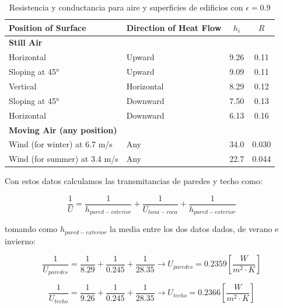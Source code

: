 \begin{table}[ht]
	\centering
	\caption{Resistencia y conductancia para aire y superficies de edificios con $\epsilon = 0.9$}
	\label{tab:building_surface_transmittances}
	\begin{tabular}{llcc}
		\toprule
		\textbf{Position of Surface}       & \textbf{Direction of Heat Flow} & $h_i$ & $R$   \\
		\midrule
		\textbf{Still Air}                 &                                 &       &       \\
		Horizontal                         & Upward                          & 9.26  & 0.11  \\
		Sloping at 45°                     & Upward                          & 9.09  & 0.11  \\
		Vertical                           & Horizontal                      & 8.29  & 0.12  \\
		Sloping at 45°                     & Downward                        & 7.50  & 0.13  \\
		Horizontal                         & Downward                        & 6.13  & 0.16  \\
		\midrule
		\textbf{Moving Air (any position)} &                                 &       &       \\
		Wind (for winter) at 6.7 m/s       & Any                             & 34.0  & 0.030 \\
		Wind (for summer) at 3.4 m/s       & Any                             & 22.7  & 0.044 \\
		\bottomrule
	\end{tabular}
\end{table}


Con estos datos calculamos las transmitancias de paredes y techo como:

\begin{equation}
	\frac{1}{U} = \frac{1}{h_{pared-interior}} + \frac{1}{U_{lana-roca}} + \frac{1}{h_{pared-exterior}}
\end{equation}

tomando como $h_{pared-exterior}$ la media entre los dos datos dados, de verano
e invierno:

\begin{equation}
	\frac{1}{U_{paredes}} = \frac{1}{8.29} + \frac{1}{0.245} + \frac{1}{28.35} \rightarrow U_{paredes} = 0.2359 \left[\frac{W}{m^2 \cdot K}\right]
\end{equation}

\begin{equation}
	\frac{1}{U_{techo}} = \frac{1}{9.26} + \frac{1}{0.245} + \frac{1}{28.35} \rightarrow U_{techo} = 0.2366 \left[\frac{W}{m^2 \cdot K}\right]
\end{equation}



